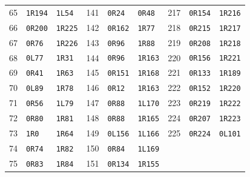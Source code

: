 {\begin{longtable}{@{}rll@{\hspace{8mm}}rll@{\hspace{8mm}}rll@{}}
65 & \texttt{1R194} & \texttt{1L54} & 141 & \texttt{0R24} & \texttt{0R48} & 217 & \texttt{0R154} & \texttt{1R216} \\
66 & \texttt{0R200} & \texttt{1R225} & 142 & \texttt{0R162} & \texttt{1R77} & 218 & \texttt{0R215} & \texttt{1R217} \\
67 & \texttt{0R76} & \texttt{1R226} & 143 & \texttt{0R96} & \texttt{1R88} & 219 & \texttt{0R208} & \texttt{1R218} \\
68 & \texttt{0L77} & \texttt{1R31} & 144 & \texttt{0R96} & \texttt{1R163} & 220 & \texttt{0R156} & \texttt{1R221} \\
69 & \texttt{0R41} & \texttt{1R63} & 145 & \texttt{0R151} & \texttt{1R168} & 221 & \texttt{0R133} & \texttt{1R189} \\
70 & \texttt{0L89} & \texttt{1R78} & 146 & \texttt{0R12} & \texttt{1R163} & 222 & \texttt{0R152} & \texttt{1R220} \\
71 & \texttt{0R56} & \texttt{1L79} & 147 & \texttt{0R88} & \texttt{1L170} & 223 & \texttt{0R219} & \texttt{1R222} \\
72 & \texttt{0R80} & \texttt{1R81} & 148 & \texttt{0R88} & \texttt{1R165} & 224 & \texttt{0R207} & \texttt{1R223} \\
73 & \texttt{1R0} & \texttt{1R64} & 149 & \texttt{0L156} & \texttt{1L166} & 225 & \texttt{0R224} & \texttt{0L101} \\
74 & \texttt{0R74} & \texttt{1R82} & 150 & \texttt{0R84} & \texttt{1L169} &  &  &  \\
75 & \texttt{0R83} & \texttt{1R84} & 151 & \texttt{0R134} & \texttt{1R155} &  &  &  \\
\end{longtable}
}
